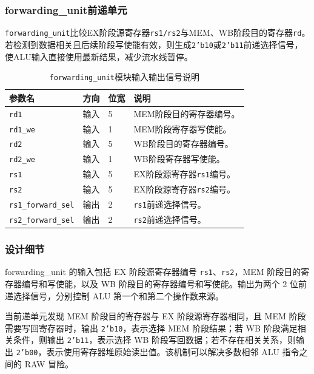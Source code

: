 \documentclass[UTF8,a4paper,12pt]{ctexart}
\newcommand{\code}[1]{\texttt{#1}}
\begin{document}
\subsubsection{forwarding\_unit前递单元}

\code{forwarding\_unit}比较EX阶段源寄存器\code{rs1/rs2}与MEM、WB阶段目的寄存器\code{rd}。若检测到数据相关且后续阶段写使能有效，则生成\code{2'b10}或\code{2'b11}前递选择信号，使ALU输入直接使用最新结果，减少流水线暂停。

\begin{table}[H]
\centering
\caption{\code{forwarding\_unit}模块输入输出信号说明}
\footnotesize
\renewcommand{\arraystretch}{1.15}
\begin{tabularx}{\textwidth}{p{3.2cm}p{1.5cm}p{2.1cm}X}
\toprule
参数名 & 方向 & 位宽 & 说明 \\
\midrule
\code{rd1} & 输入 & 5 & MEM阶段目的寄存器编号。 \\
\code{rd1\_we} & 输入 & 1 & MEM阶段寄存器写使能。 \\
\code{rd2} & 输入 & 5 & WB阶段目的寄存器编号。 \\
\code{rd2\_we} & 输入 & 1 & WB阶段寄存器写使能。 \\
\code{rs1} & 输入 & 5 & EX阶段源寄存器\code{rs1}编号。 \\
\code{rs2} & 输入 & 5 & EX阶段源寄存器\code{rs2}编号。 \\
\code{rs1\_forward\_sel} & 输出 & 2 & \code{rs1}前递选择信号。 \\
\code{rs2\_forward\_sel} & 输出 & 2 & \code{rs2}前递选择信号。 \\
\bottomrule
\end{tabularx}
\end{table}

\subsubsection*{设计细节}

forwarding\_unit 的输入包括 EX 阶段源寄存器编号 \code{rs1}、\code{rs2}，MEM 阶段目的寄存器编号和写使能，以及 WB 阶段目的寄存器编号和写使能。输出为两个 2 位前递选择信号，分别控制 ALU 第一个和第二个操作数来源。

当前递单元发现 MEM 阶段目的寄存器与 EX 阶段源寄存器相同，且 MEM 阶段需要写回寄存器时，输出 \code{2'b10}，表示选择 MEM 阶段结果；若 WB 阶段满足相关条件，则输出 \code{2'b11}，表示选择 WB 阶段写回数据；若不存在相关关系，则输出 \code{2'b00}，表示使用寄存器堆原始读出值。该机制可以解决多数相邻 ALU 指令之间的 RAW 冒险。
\end{document}
